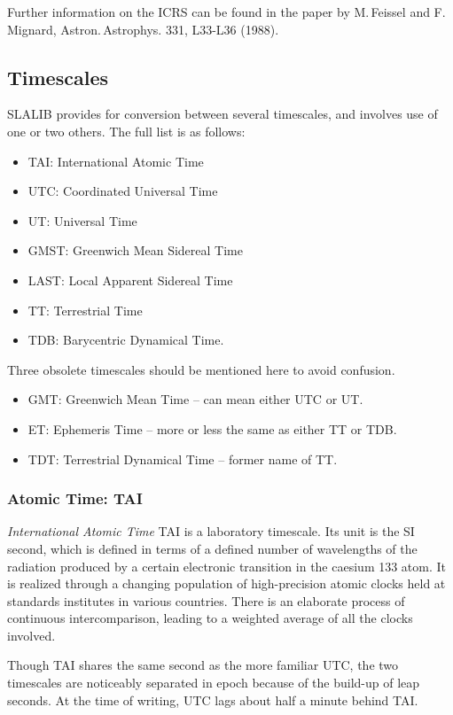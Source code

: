 \documentclass[11pt,twoside]{article}
\begin{document}
Further information on the ICRS can be found in the paper by M.\,Feissel
and F.\,Mignard, Astron.\,Astrophys. 331, L33-L36 (1988).

\subsection{Timescales}
SLALIB provides for conversion between several timescales, and involves
use of one or two others.  The full list is as follows:
\begin{itemize}
\item TAI: International Atomic Time
\item UTC: Coordinated Universal Time
\item UT: Universal Time
\item GMST: Greenwich Mean Sidereal Time
\item LAST: Local Apparent Sidereal Time
\item TT: Terrestrial Time
\item TDB: Barycentric Dynamical Time.
\end{itemize}
Three obsolete timescales should be mentioned here to avoid confusion.
\begin{itemize}
\item GMT: Greenwich Mean Time -- can mean either UTC or UT.
\item ET: Ephemeris Time -- more or less the same as either TT or TDB.
\item TDT: Terrestrial Dynamical Time -- former name of TT.
\end{itemize}

\subsubsection{Atomic Time: TAI}
{\it International Atomic Time}\/ TAI is a laboratory timescale.  Its
unit is the SI second, which is defined in terms of a
defined number
of wavelengths of the radiation produced by a certain electronic
transition in the caesium 133 atom.  It
is realized through a changing
population of high-precision atomic clocks held
at standards institutes in various countries.  There is an
elaborate process of continuous intercomparison, leading to
a weighted average of all the clocks involved.

Though TAI shares the same second as the more familiar UTC, the
two timescales are noticeably separated in epoch because of the
build-up of leap seconds.  At the time of writing, UTC
lags about half a minute behind TAI.
\end{document}
